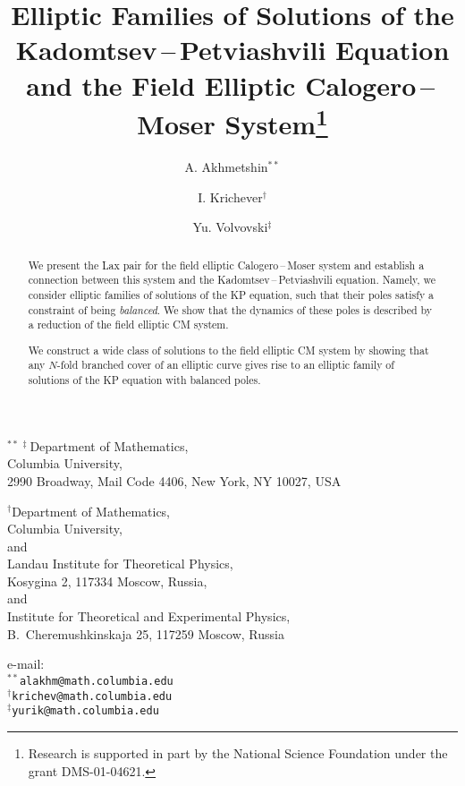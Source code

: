 \documentclass[a4paper,11pt]{article}
\theoremstyle{plain}
\theoremstyle{remark}
\begin{document}

\begin{titlepage}

\title{Elliptic Families of Solutions of the
Kadomtsev\,--\,Petviashvili Equation and
the Field Elliptic Calogero\,--\,Moser
System\thanks{Research
is supported in part by the National Science
Foundation under the grant DMS-01-04621.}}

\bigskip
\author{A. Akhmetshin${}^{**}$\and I. Krichever${}^{\dagger}$\and
Yu. Volvovski${}^{\ddagger}$}
\date{}
\maketitle

\thispagestyle{empty}

\begin{center}
\small
${}^{**\,\ddagger}$Department of Mathematics,\\
Columbia University,\\
2990 Broadway, Mail Code 4406, New York, NY 10027, USA
\end{center}

\begin{center}
\small
${}^{\dagger}$Department of Mathematics,\\
Columbia University,\\
and\\
Landau Institute for Theoretical Physics,\\
Kosygina 2, 117334 Moscow, Russia,\\
and\\
Institute for Theoretical and Experimental Physics,\\
B.~Cheremushkinskaja 25, 117259 Moscow, Russia
\end{center}

\begin{center}
\small
e-mail:\\
${}^{**}$\verb"alakhm@math.columbia.edu"\\
${}^{\dagger}$\verb"krichev@math.columbia.edu"\\
${}^{\ddagger}$\verb"yurik@math.columbia.edu"
\end{center}

\bigskip
\begin{abstract}
We present the Lax pair for the field elliptic Calogero\,--\,Moser
system and establish a connection between this system and the
Kadomtsev\,--\,Petviashvili equation.
Namely, we consider elliptic families of solutions of the KP equation,
such that their poles satisfy a constraint of being \emph{balanced}.
We show that the dynamics of these poles is described by a reduction
of the field elliptic CM system.

We construct a wide class of solutions to the field elliptic
CM system by showing that any $N$-fold branched cover of an
elliptic curve gives rise to an elliptic family of solutions
of the KP equation with balanced poles.
\end{abstract}

\vfill

\end{titlepage}
\end{document}

